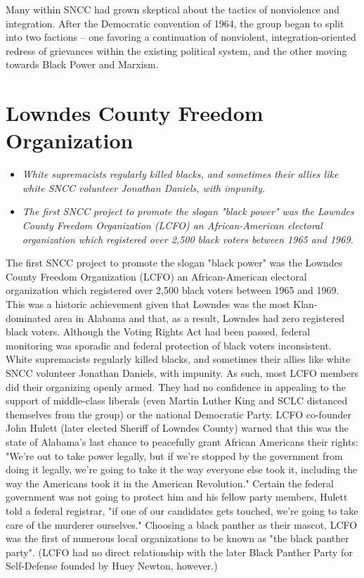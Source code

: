Many within SNCC had grown skeptical about the tactics of nonviolence
and integration. After the Democratic convention of 1964, the group
began to split into two factions -- one favoring a continuation of
nonviolent, integration-oriented redress of grievances within the
existing political system, and the other moving towards Black Power and
Marxism.

\section{Lowndes County Freedom
Organization}\label{lowndes-county-freedom-organization}

\begin{itemize}
\item
  \emph{White supremacists regularly killed blacks, and sometimes their
  allies like white SNCC volunteer Jonathan Daniels, with impunity.}
\item
  \emph{The first SNCC project to promote the slogan "black power" was
  the Lowndes County Freedom Organization (LCFO) an African-American
  electoral organization which registered over 2,500 black voters
  between 1965 and 1969.}
\end{itemize}

The first SNCC project to promote the slogan "black power" was the
Lowndes County Freedom Organization (LCFO) an African-American electoral
organization which registered over 2,500 black voters between 1965 and
1969. This was a historic achievement given that Lowndes was the most
Klan-dominated area in Alabama and that, as a result, Lowndes had zero
registered black voters. Although the Voting Rights Act had been passed,
federal monitoring was sporadic and federal protection of black voters
inconsistent. White supremacists regularly killed blacks, and sometimes
their allies like white SNCC volunteer Jonathan Daniels, with impunity.
As such, most LCFO members did their organizing openly armed. They had
no confidence in appealing to the support of middle-class liberals (even
Martin Luther King and SCLC distanced themselves from the group) or the
national Democratic Party. LCFO co-founder John Hulett (later elected
Sheriff of Lowndes County) warned that this was the state of Alabama's
last chance to peacefully grant African Americans their rights: "We're
out to take power legally, but if we're stopped by the government from
doing it legally, we're going to take it the way everyone else took it,
including the way the Americans took it in the American Revolution."
Certain the federal government was not going to protect him and his
fellow party members, Hulett told a federal registrar, "if one of our
candidates gets touched, we're going to take care of the murderer
ourselves." Choosing a black panther as their mascot, LCFO was the first
of numerous local organizations to be known as "the black panther
party". (LCFO had no direct relationship with the later Black Panther
Party for Self-Defense founded by Huey Newton, however.)

